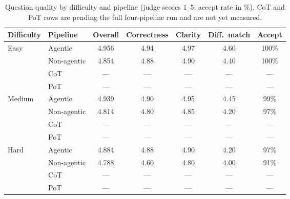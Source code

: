 \begin{table}[H]
\centering
\caption{Question quality by difficulty and pipeline (judge scores $1$--$5$; accept
rate in \%). CoT and PoT rows are pending the full four-pipeline run and are not yet
measured.}
\label{tab:bulk-quality}
\small
\begin{tabular}{|l|l|c|c|c|c|c|}
\hline
\textbf{Difficulty} & \textbf{Pipeline} & \textbf{Overall} & \textbf{Correctness} &
\textbf{Clarity} & \textbf{Diff.\ match} & \textbf{Accept} \\
\hline
Easy   & Agentic     & 4.956 & 4.94 & 4.97 & 4.60 & 100\% \\
       & Non-agentic & 4.854 & 4.88 & 4.90 & 4.40 & 100\% \\
       & CoT         & ---   & ---  & ---  & ---  & ---   \\
       & PoT         & ---   & ---  & ---  & ---  & ---   \\
\hline
Medium & Agentic     & 4.939 & 4.90 & 4.95 & 4.45 & 99\% \\
       & Non-agentic & 4.814 & 4.80 & 4.85 & 4.20 & 97\% \\
       & CoT         & ---   & ---  & ---  & ---  & ---  \\
       & PoT         & ---   & ---  & ---  & ---  & ---  \\
\hline
Hard   & Agentic     & 4.884 & 4.88 & 4.90 & 4.20 & 97\% \\
       & Non-agentic & 4.788 & 4.60 & 4.80 & 4.00 & 91\% \\
       & CoT         & ---   & ---  & ---  & ---  & ---  \\
       & PoT         & ---   & ---  & ---  & ---  & ---  \\
\hline
\end{tabular}
\end{table}

